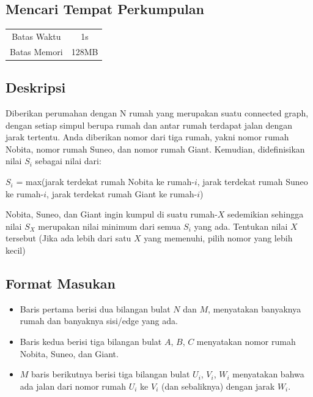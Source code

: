 \documentclass{article}
\begin{document}
\begin{center}
    \section*{Mencari Tempat Perkumpulan} %

    \begin{tabular}{ | c c | }
        \hline
        Batas Waktu  & 1s \\    %
        Batas Memori & 128MB \\  %
        \hline
    \end{tabular}
\end{center}

\subsection*{Deskripsi}
Diberikan perumahan dengan N rumah yang merupakan suatu connected graph, dengan setiap simpul berupa rumah dan antar rumah terdapat jalan dengan jarak tertentu. Anda diberikan nomor dari tiga rumah, yakni nomor rumah Nobita, nomor rumah Suneo, dan nomor rumah Giant. Kemudian, didefinisikan nilai $S_i$ sebagai nilai dari:

\begin{center}
    $S_i$ = max(jarak terdekat rumah Nobita ke rumah-$i$,
    jarak terdekat rumah Suneo ke rumah-$i$,
    jarak terdekat rumah Giant ke rumah-$i$)    
\end{center}


Nobita, Suneo, dan Giant ingin kumpul di suatu rumah-$X$ sedemikian sehingga nilai $S_X$ merupakan nilai minimum dari semua $S_i$ yang ada. Tentukan nilai $X$ tersebut (Jika ada lebih dari satu $X$ yang memenuhi, pilih nomor yang lebih kecil)

\subsection*{Format Masukan}
\begin{itemize}
    \item Baris pertama berisi dua bilangan bulat $N$ dan $M$, menyatakan banyaknya rumah dan banyaknya sisi/edge yang ada.
    \item Baris kedua berisi tiga bilangan bulat $A$, $B$, $C$ menyatakan nomor rumah Nobita, Suneo, dan Giant.
    \item $M$ baris berikutnya berisi tiga bilangan bulat $U_i$, $V_i$, $W_i$ menyatakan bahwa ada jalan dari nomor rumah $U_i$ ke $V_i$ (dan sebaliknya) dengan jarak $W_i$.
\end{itemize}
\end{document}
